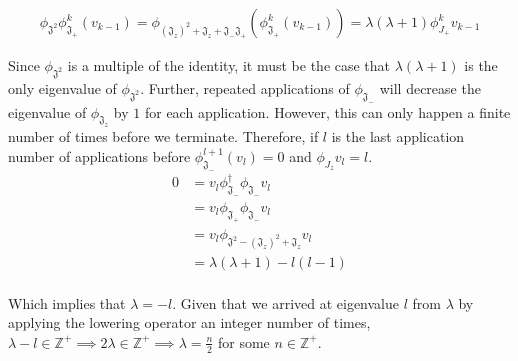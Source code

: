 \documentclass[10pt]{ucthesis}
\newcommand{\Z}{\mathbb{Z}}
\begin{document}
\begin{equation}
	\begin{aligned}
		\phi_{\mathfrak{J^2}}\phi_{\mathfrak{J}_+}^k(v_{k-1}) = \phi_{(\mathfrak{J}_z)^2 +\mathfrak{J}_z+ \mathfrak{J}_-\mathfrak{J}_+}(\phi_{\mathfrak{J}_+}^k(v_{k-1})) = \lambda(\lambda + 1) \phi_{J_+}^kv_{k-1}
	\end{aligned}
\end{equation} 

Since $\phi_{\mathfrak{J^2}}$ is a multiple of the identity, it must be the case that $\lambda(\lambda +1)$ is the only eigenvalue of $\phi_{\mathfrak{J^2}}$. Further, repeated applications of $\phi_{\mathfrak{J}_-}$ will decrease the eigenvalue of $\phi_{\mathfrak{J}_z}$ by $1$ for each application. However, this can only happen a finite number of times before we terminate. Therefore, if $l$ is the last application number of applications before  $\phi_{\mathfrak{J}_-}^{l+1}(v_{l}) = 0$ and $\phi_{J_z}v_l = l$.
\begin{equation}
	\begin{aligned}
		0 &= v_{l}  \phi_{\mathfrak{J}_-}^\dag \phi_{\mathfrak{J}_-} v_{l} \\
		&= v_{l} \phi_{\mathfrak{J}_+}\phi_{\mathfrak{J}_-}v_{l} \\
			&= v_{l}\phi_{\mathfrak{J^2} - (\mathfrak{J}_z)^2 + \mathfrak{J}_z}v_{l} \\
		&= \lambda(\lambda+ 1) - l(l - 1)\\
	\end{aligned}
\end{equation} 

Which implies that $\lambda = -l$. Given that we arrived at eigenvalue $l$ from $\lambda$ by applying the lowering operator an integer number of times, $\lambda - l \in \Z^+ \implies 2\lambda\in\Z^+ \implies \lambda = \frac{n}{2}$ for some $n\in\Z^+.$
\end{document}
